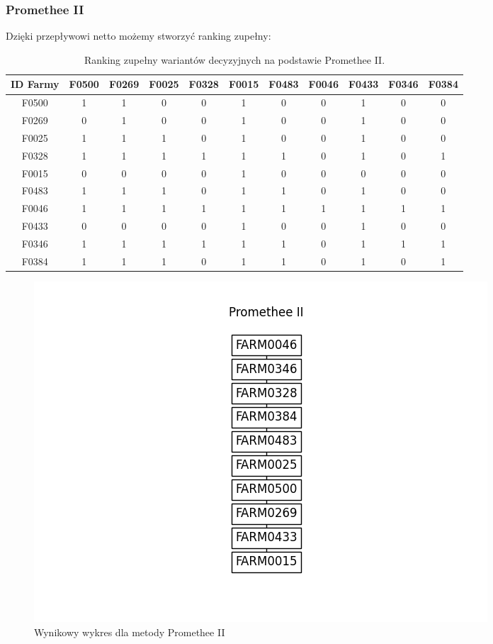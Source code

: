 \documentclass[11pt]{article}
\begin{document}
\subsubsection{Promethee II}
Dzięki przepływowi netto możemy stworzyć ranking zupełny:
\begin{table}[H]
\centering
\begin{tabular}{|c||c|c|c|c|c|c|c|c|c|c|}
\hline
\textbf{ID Farmy} & \textbf{F0500} & \textbf{F0269} & \textbf{F0025} & \textbf{F0328} & \textbf{F0015} & \textbf{F0483} & \textbf{F0046} & \textbf{F0433} & \textbf{F0346} & \textbf{F0384} \\
\hline
F0500 & 1 & 1 & 0 & 0 & 1 & 0 & 0 & 1 & 0 & 0 \\
\hline
F0269 & 0 & 1 & 0 & 0 & 1 & 0 & 0 & 1 & 0 & 0 \\
\hline
F0025 & 1 & 1 & 1 & 0 & 1 & 0 & 0 & 1 & 0 & 0 \\
\hline
F0328 & 1 & 1 & 1 & 1 & 1 & 1 & 0 & 1 & 0 & 1 \\
\hline
F0015 & 0 & 0 & 0 & 0 & 1 & 0 & 0 & 0 & 0 & 0 \\
\hline
F0483 & 1 & 1 & 1 & 0 & 1 & 1 & 0 & 1 & 0 & 0 \\
\hline
F0046 & 1 & 1 & 1 & 1 & 1 & 1 & 1 & 1 & 1 & 1 \\
\hline
F0433 & 0 & 0 & 0 & 0 & 1 & 0 & 0 & 1 & 0 & 0 \\
\hline
F0346 & 1 & 1 & 1 & 1 & 1 & 1 & 0 & 1 & 1 & 1 \\
\hline
F0384 & 1 & 1 & 1 & 0 & 1 & 1 & 0 & 1 & 0 & 1 \\
\hline
\end{tabular}
\caption{Ranking zupełny wariantów decyzyjnych na podstawie Promethee II.}
\end{table}

\begin{figure}[H]
	\centering
	\includegraphics[scale=0.75]{output/Promethee II.png}
	\caption{Wynikowy wykres dla metody Promethee II}
\end{figure}
\end{document}
